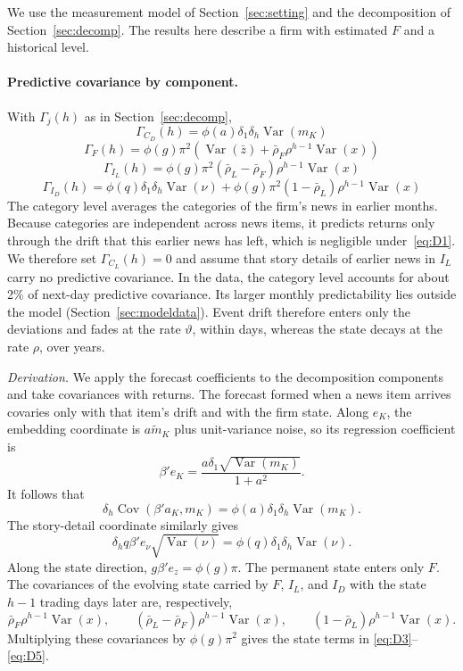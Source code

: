 \documentclass[11pt,letterpaper]{article}
\theoremstyle{remark}
\DeclareMathOperator{\Var}{Var}
\DeclareMathOperator{\Cov}{Cov}
\begin{document}
We use the measurement model of Section~\ref{sec:setting} and the decomposition of Section~\ref{sec:decomp}. The results here describe a firm with estimated $F$ and a historical level.

\paragraph{Predictive covariance by component.}
With $\Gamma_j(h)$ as in Section~\ref{sec:decomp},
\begin{equation}\label{eq:D2}
\Gamma_{C_D}(h)=\phi(a)\delta_1\delta_h\Var(m_K)
\end{equation}
\begin{equation}\label{eq:D3}
\Gamma_F(h)=\phi(g)\pi^2\left(\Var(\bar z)+\bar\rho_F\rho^{h-1}\Var(x)\right)
\end{equation}
\begin{equation}\label{eq:D4}
\Gamma_{I_L}(h)=\phi(g)\pi^2(\bar\rho_L-\bar\rho_F)\rho^{h-1}\Var(x)
\end{equation}
\begin{equation}\label{eq:D5}
\Gamma_{I_D}(h)=\phi(q)\delta_1\delta_h\Var(\nu)
+\phi(g)\pi^2(1-\bar\rho_L)\rho^{h-1}\Var(x)
\end{equation}
The category level averages the categories of the firm's news in earlier months. Because categories are independent across news items, it predicts returns only through the drift that this earlier news has left, which is negligible under~\eqref{eq:D1}. We therefore set $\Gamma_{C_L}(h)=0$ and assume that story details of earlier news in $I_L$ carry no predictive covariance. In the data, the category level accounts for about 2\% of next-day predictive covariance. Its larger monthly predictability lies outside the model (Section~\ref{sec:modeldata}). Event drift therefore enters only the deviations and fades at the rate $\vartheta$, within days, whereas the state decays at the rate $\rho$, over years.

\emph{Derivation.}
We apply the forecast coefficients to the decomposition components and take covariances with returns. The forecast formed when a news item arrives covaries only with that item's drift and with the firm state. Along $e_K$, the embedding coordinate is $a\tilde m_K$ plus unit-variance noise, so its regression coefficient is
\[
\beta'e_K=\frac{a\delta_1\sqrt{\Var(m_K)}}{1+a^2}.
\]
It follows that
\[
\delta_h\Cov(\beta'a_K,m_K)
=\phi(a)\delta_1\delta_h\Var(m_K).
\]
The story-detail coordinate similarly gives
\[
\delta_h q\beta'e_\nu\sqrt{\Var(\nu)}
=\phi(q)\delta_1\delta_h\Var(\nu).
\]
Along the state direction, $g\beta'e_z=\phi(g)\pi$. The permanent state enters only $F$. The covariances of the evolving state carried by $F$, $I_L$, and $I_D$ with the state $h-1$ trading days later are, respectively,
\[
\bar\rho_F\rho^{h-1}\Var(x),\qquad
(\bar\rho_L-\bar\rho_F)\rho^{h-1}\Var(x),\qquad
(1-\bar\rho_L)\rho^{h-1}\Var(x).
\]
Multiplying these covariances by $\phi(g)\pi^2$ gives the state terms in \eqref{eq:D3}--\eqref{eq:D5}.
\end{document}
